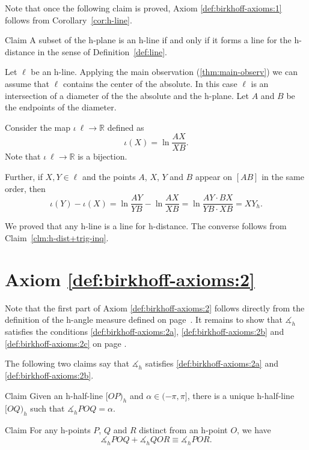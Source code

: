 Note that once the following claim is proved,
Axiom \ref{def:birkhoff-axioms:1} 
follows from Corollary~\ref{cor:h-line}.

\begin{thm}{Claim}
A subset of the h-plane is an h-line if and only if it forms a line for the h-distance in the sense of Definition~\ref{def:line}.
\end{thm}

Let $\ell$ be an h-line.
Applying the main observation (\ref{thm:main-observ}) we can assume that $\ell$ contains the center of the absolute.
In this case $\ell$ is an intersection of a diameter of the the absolute and the h-plane.
Let $A$ and $B$ be the endpoints of the diameter.

Consider the map $\iota\:\ell\to \mathbb{R}$ defined as
$$\iota(X)=\ln \frac{AX}{XB}.$$
Note that $\iota\:\ell\to \mathbb{R}$ is a bijection.

Further, if $X,Y\in \ell$ and the points $A$, $X$, $Y$ and $B$ appear on $[AB]$ in the same order, then
\[\iota(Y)-\iota(X)=\ln \frac{AY}{YB}-\ln \frac{AX}{XB}=\ln \frac{AY\cdot BX}{YB\cdot XB}=XY_h.\]

We proved that any h-line is a line for h-distance.
The converse follows from Claim~\ref{clm:h-dist+trig-inq}.
\qeds


\section*{Axiom \ref{def:birkhoff-axioms:2}}

Note that the first part of Axiom \ref{def:birkhoff-axioms:2} follows directly from the definition of the h-angle measure defined on page~\pageref{h-angle measure}.
It remains to show that $\measuredangle_h$ satisfies the conditions \ref{def:birkhoff-axioms:2a}, \ref{def:birkhoff-axioms:2b} and \ref{def:birkhoff-axioms:2c} on page \pageref{def:birkhoff-axioms:2b}.

The following two claims say that
$\measuredangle_h$ satisfies
 \ref{def:birkhoff-axioms:2a} and \ref{def:birkhoff-axioms:2b}.

\begin{thm}{Claim}\label{clm:h2a}
Given an h-half-line $[O P)_h$ and $\alpha\in(-\pi,\pi]$, there is a unique h-half-line $[O Q)_h$ such that $\measuredangle_h P O Q= \alpha$.
\end{thm}

\begin{thm}{Claim}\label{clm:h2b}
For any h-points $P$, $Q$ and $R$ distinct from an h-point $O$, we have
$$\measuredangle_h P O Q+\measuredangle_h Q O R
\equiv\measuredangle_h P O R.$$

\end{thm}

